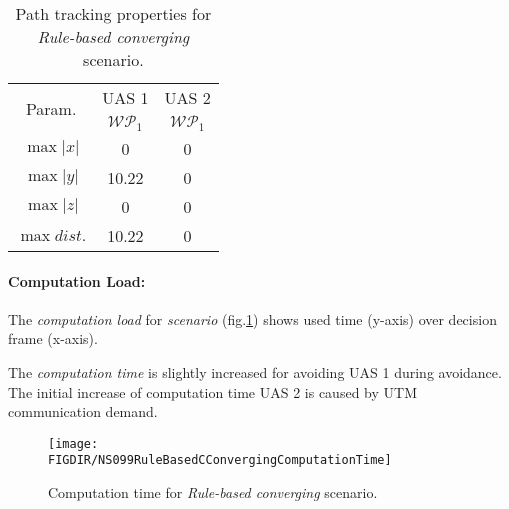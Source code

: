 \begin{table}[H]
    \centering
    \begin{tabular}{c||c|c}
        \multirow{2}{*}{Param.} & UAS 1     & UAS 2              \\\cline{2-3}
                        & $\mathscr{WP}_1$  & $\mathscr{WP}_1$   \\\hline\hline
          $\max |x|$    & 0                 & 0                  \\\hline
          $\max |y|$    & 10.22             & 0                  \\\hline
          $\max |z|$    & 0                 & 0                  \\\hline
          $\max dist.$  & 10.22             & 0                  \\
    \end{tabular}
    \caption{Path tracking properties for \emph{Rule-based converging} scenario.}
    \label{tab:pathTrackingParametersForRuleBasedConverging}
\end{table}

\paragraph{Computation Load:} The \emph{computation load} for \emph{scenario} (fig.\ref{fig:ruleBasedCConvergingComputationTime}) shows used time (y-axis) over decision frame (x-axis).

The \emph{computation time} is slightly increased for avoiding UAS 1 during avoidance. The initial increase of computation time UAS 2 is caused by UTM communication demand.

\begin{figure}[H]
    \centering
    \texttt{[image: \\FIGDIR/NS099RuleBasedCConvergingComputationTime]} 
    \caption{Computation time for \emph{Rule-based converging} scenario.}
    \label{fig:ruleBasedCConvergingComputationTime}
\end{figure}